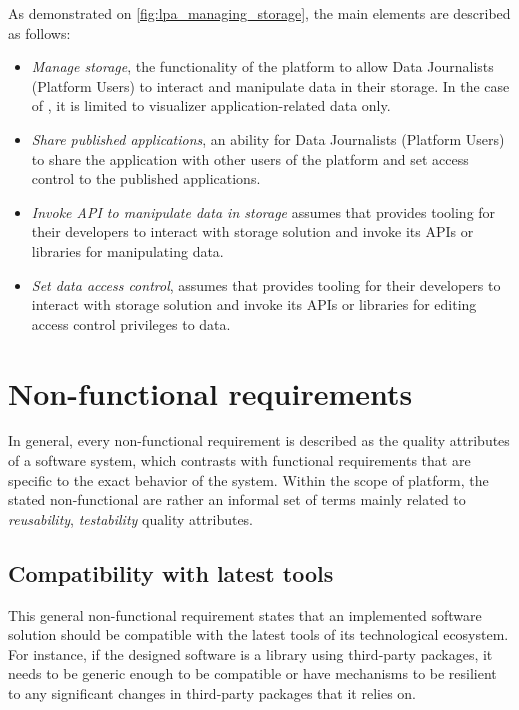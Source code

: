 As demonstrated on \autoref{fig:lpa_managing_storage}, the main elements are described as follows:
\begin{itemize}
    \item \textit{Manage storage}, the functionality of the platform to allow Data Journalists (Platform Users) to interact and manipulate data in their storage. In the case of \lpa{}, it is limited to visualizer application-related data only. 
    \item \textit{Share published applications}, an ability for Data Journalists (Platform Users) to share the application with other users of the \lpa{} platform and set access control to the published applications.
    \item \textit{Invoke API to manipulate data in storage} assumes that \lpa{} provides tooling for their developers to interact with storage solution and invoke its APIs or libraries for manipulating data.
    \item \textit{Set data access control}, assumes that \lpa{} provides tooling for their developers to interact with storage solution and invoke its APIs or libraries for editing access control privileges to data.
\end{itemize}

\section{Non-functional requirements}
\label{ssec:non_functional_requirements}

In general, every non-functional requirement is described as the quality attributes of a software system, which contrasts with functional requirements that are specific to the exact behavior of the system. Within the scope of \lpa{} platform, the stated non-functional are rather an informal set of terms mainly related to \textit{reusability}, \textit{testability} quality attributes. 

\subsection{Compatibility with latest tools}

This general non-functional requirement states that an implemented software solution should be compatible with the latest tools of its technological ecosystem. For instance, if the designed software is a library using third-party packages, it needs to be generic enough to be compatible or have mechanisms to be resilient to any significant changes in third-party packages that it relies on.

